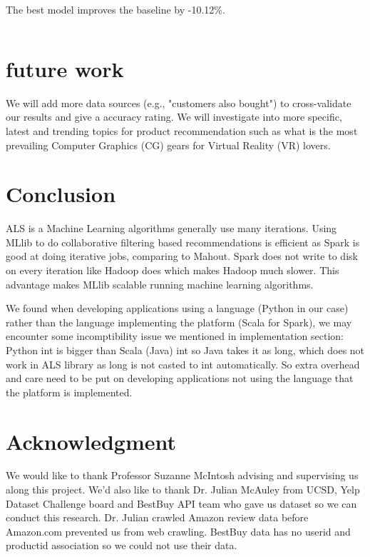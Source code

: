 \documentclass[conference]{IEEEtran}
\begin{document}
The best model improves the baseline by -10.12$\%$.


\begin{lstlisting}
\end{lstlisting}


\section{future work}

We will add more data sources (e.g., "customers also bought") to cross-validate our results and give a accuracy rating. We will investigate into more specific, latest and trending topics for product recommendation such as what is the most prevailing Computer Graphics (CG) gears for Virtual Reality (VR) lovers. 

\section{Conclusion}

ALS is a Machine Learning algorithms generally use many iterations. Using MLlib to do collaborative filtering based recommendations is efficient as Spark is good at doing iterative jobs, comparing to Mahout. Spark does not write to disk on every iteration like Hadoop does which makes Hadoop much slower. This advantage makes MLlib scalable running machine learning algorithms. 

We found when developing applications using a language (Python in our case) rather than the language implementing the platform (Scala for Spark), we may encounter some incomptibility issue we mentioned in implementation section: Python int is bigger than Scala (Java) int so Java takes it as long, which does not work in ALS library as long is not casted to int automatically. So extra overhead and care need to be put on developing applications not using the language that the platform is implemented. 

\section*{Acknowledgment}

We would like to thank Professor Suzanne McIntosh advising and supervising us along this project. We'd also like to thank Dr. Julian McAuley from UCSD, Yelp Dataset Challenge board \cite{YelpDataset} and BestBuy API team who gave us dataset so we can conduct this research. Dr. Julian crawled Amazon review data before Amazon.com prevented us from web crawling. BestBuy data has no userid and productid association so we could not use their data. 
\end{document}
